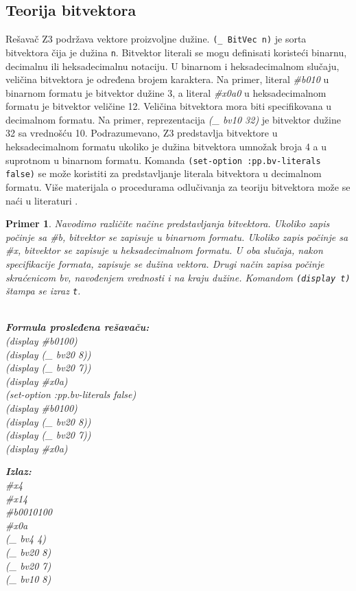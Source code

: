 \documentclass[12pt,oneside]{memoir}
\newtheorem{primer}{Primer}
\begin{document}
\subsection{Teorija bitvektora} 
Rešavač Z3 podržava vektore proizvoljne dužine. \texttt{(\_ BitVec n)} je sorta bitvektora čija je dužina \texttt{n}. Bitvektor literali se mogu definisati koristeći binarnu, decimalnu ili heksadecimalnu notaciju. U binarnom i heksadecimalnom slučaju, veličina bitvektora je određena brojem karaktera. Na primer, literal \textit{\#b010} u binarnom formatu je bitvektor dužine 3, a literal \textit{\#x0a0} u heksadecimalnom formatu je bitvektor veličine 12. Veličina bitvektora mora biti specifikovana u decimalnom formatu. Na primer, reprezentacija \textit{(\_ bv10 32)} je bitvektor dužine 32 sa vrednošću 10. Podrazumevano, Z3 predstavlja bitvektore u heksadecimalnom formatu ukoliko je dužina bitvektora umnožak broja 4 a u suprotnom u binarnom formatu. Komanda 
\texttt{(set-option :pp.bv-literals false)} se može koristiti za predstavljanje literala bitvektora u decimalnom formatu. Više materijala o procedurama odlučivanja za teoriju bitvektora može se naći u literaturi \cite{DPBitvector}.
\begin{primer} Navodimo različite načine predstavljanja bitvektora. Ukoliko zapis počinje sa \#b, bitvektor se zapisuje u binarnom formatu. Ukoliko zapis počinje sa \#x, bitvektor se zapisuje u heksadecimalnom formatu. U oba slučaja, nakon specifikacije formata, zapisuje se dužina vektora. Drugi način zapisa počinje skraćenicom bv, navođenjem vrednosti i na kraju dužine. Komandom \texttt{(display t)} štampa se izraz \texttt{t}.\\\\
\begin{minipage}[b]{0.45\textwidth}
\textbf{Formula prosleđena rešavaču:}
\\(display \#b0100)
\\(display (\_ bv20 8))
\\(display (\_ bv20 7))
\\(display \#x0a) 
\\(set-option :pp.bv-literals false)
\\(display \#b0100)
\\(display (\_ bv20 8))
\\(display (\_ bv20 7))
\\(display \#x0a)
\end{minipage}
\hspace{2.5cm}
\begin{minipage}[t]{0.4\textwidth}
\vspace{-5.93cm}
\textbf{Izlaz:}
\\\#x4 
\\\#x14 
\\\#b0010100 
\\\#x0a 
\\(\_ bv4 4) 
\\(\_ bv20 8) 
\\(\_ bv20 7) 
\\(\_ bv10 8)
\end{minipage}
\end{primer}
\end{document}
